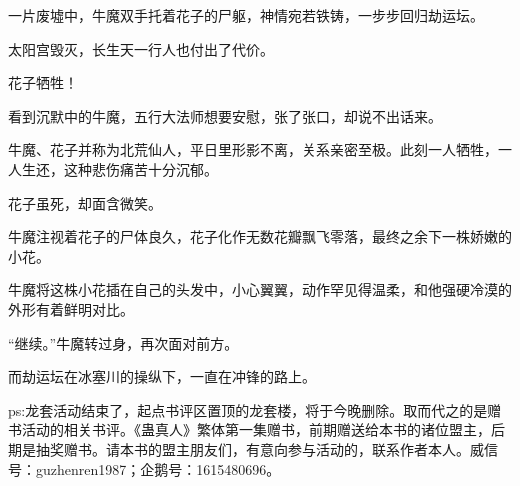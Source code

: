 \begin{this_body}
一片废墟中，牛魔双手托着花子的尸躯，神情宛若铁铸，一步步回归劫运坛。

太阳宫毁灭，长生天一行人也付出了代价。

花子牺牲！

看到沉默中的牛魔，五行大法师想要安慰，张了张口，却说不出话来。

牛魔、花子并称为北荒仙人，平日里形影不离，关系亲密至极。此刻一人牺牲，一人生还，这种悲伤痛苦十分沉郁。

花子虽死，却面含微笑。

牛魔注视着花子的尸体良久，花子化作无数花瓣飘飞零落，最终之余下一株娇嫩的小花。

牛魔将这株小花插在自己的头发中，小心翼翼，动作罕见得温柔，和他强硬冷漠的外形有着鲜明对比。

“继续。”牛魔转过身，再次面对前方。

而劫运坛在冰塞川的操纵下，一直在冲锋的路上。

ps:龙套活动结束了，起点书评区置顶的龙套楼，将于今晚删除。取而代之的是赠书活动的相关书评。《蛊真人》繁体第一集赠书，前期赠送给本书的诸位盟主，后期是抽奖赠书。请本书的盟主朋友们，有意向参与活动的，联系作者本人。威信号：guzhenren1987；企鹅号：1615480696。

\end{this_body}

